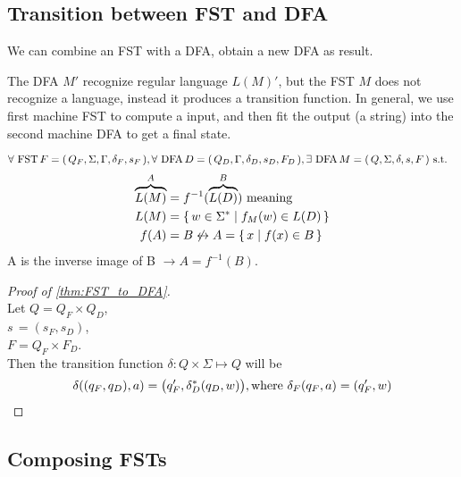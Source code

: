
\subsection{Transition between FST and DFA}

We can combine an FST with a DFA, obtain a new DFA as result.

The DFA $M'$ recognize regular language $L(M)'$, but the FST $M$ does not recognize a
language, instead it produces a transition function. In general, we use first machine FST
to compute a input, and then fit the output (a string) into the second machine DFA to get
a final state.

\begin{theorem}
    \label{thm:FST_to_DFA} 
    $
    \forall \text{ \upshape FST} \, F = { \left(\,Q_F, \Sigma,\Gamma, \delta_F, s_F\,\right) }, \\
    \forall \text{ \upshape DFA} \, D = { \left(\,Q_D, \Gamma, \delta_D, s_D, F_D\,\right) }, \\
    \exists \text{ \upshape DFA} \, M = { \left(\,Q, \Sigma, \delta, s, F\,\right) } 
    \text{ s.t. \ }
    $
    \begin{align*}
        \overbrace{L(M)}^A &= f^{-1}(\overbrace{L(D)}^B) \text{ meaning }\\
        L(M) &= { \left\{\,w \in \Sigma^* \mid f_M(w) \in L(D)\,\right\} } \\
        f(A) &= B \not \leftrightarrow A = { \left\{\,x \mid f(x) \in B\,\right\} } 
    \end{align*}
    A is the inverse image of B $\rightarrow A = f^{-1}(B)$.
\end{theorem}

\begin{proof}[Proof of \autoref{thm:FST_to_DFA}] \ \\
    Let $Q = Q_F \times Q_D$,\\
    \phantom{Let}$s\,=(s_F,s_D) $,\\
    \phantom{Let}$F  = Q_F \times F_D$.\\
    Then the transition function 
    $
    \delta \colon Q \times \Sigma \mapsto Q
    $
    will be
    \[
        \delta((q_F,q_D),a) = \big( q_F', \delta_D^*(q_D,w)\big),
        \text{\upshape where }\delta_F(q_F,a) = (q_F',w) 
    \]
\end{proof}

\subsection{Composing FSTs}

